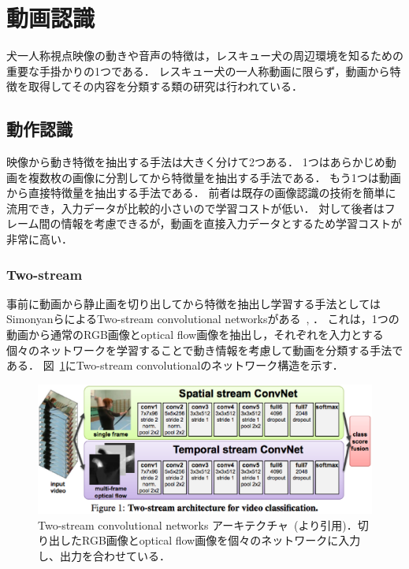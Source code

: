 \section{動画認識}
犬一人称視点映像の動きや音声の特徴は，レスキュー犬の周辺環境を知るための重要な手掛かりの1つである．
レスキュー犬の一人称動画に限らず，動画から特徴を取得してその内容を分類する類の研究は行われている．
\subsection{動作認識}
映像から動き特徴を抽出する手法は大きく分けて2つある．
1つはあらかじめ動画を複数枚の画像に分割してから特徴量を抽出する手法である．
もう1つは動画から直接特徴量を抽出する手法である．
前者は既存の画像認識の技術を簡単に流用でき，入力データが比較的小さいので学習コストが低い．
対して後者はフレーム間の情報を考慮できるが，動画を直接入力データとするため学習コストが非常に高い．
\subsubsection{Two-stream}
事前に動画から静止画を切り出してから特徴を抽出し学習する手法としてはSimonyanらによるTwo-stream convolutional networksがある~\cite{simonyan2014two}, \cite{wang2015towards}．
これは，1つの動画から通常のRGB画像とoptical flow画像を抽出し，それぞれを入力とする個々のネットワークを学習することで動き情報を考慮して動画を分類する手法である．
図~\ref{2st_network}にTwo-stream convolutionalのネットワーク構造を示す．
\begin{figure}[htbp]
 \begin{center}
  \includegraphics[width=12cm]{./Figures/two-stream.eps}
  \caption{Two-stream convolutional networks アーキテクチャ~(\cite{simonyan2014two}より引用)．切り出したRGB画像とoptical flow画像を個々のネットワークに入力し、出力を合わせている．}
  \label{2st_network}
 \end{center}
\end{figure}

